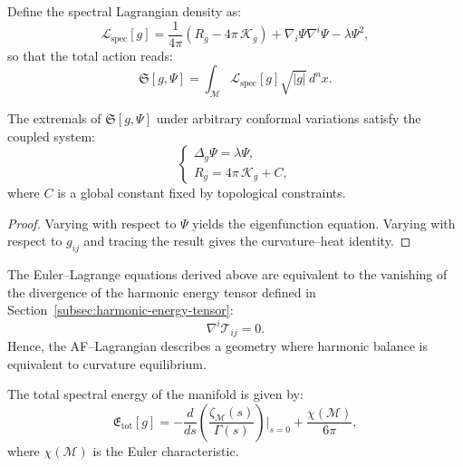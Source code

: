 \begin{definition}
\label{def:spectral-lagrangian}
Define the spectral Lagrangian density as:
\begin{equation}
\label{eq:spectral-lagrangian}
\mathcal{L}_{\mathrm{spec}}[g]
=
\frac{1}{4\pi}
\left(
R_g - 4\pi\,\mathcal{K}_g
\right)
+
\nabla_i \Psi \nabla^i \Psi
- \lambda \Psi^2,
\end{equation}
so that the total action reads:
\[
\mathfrak{S}[g,\Psi]
=
\int_{\mathcal{M}}
\mathcal{L}_{\mathrm{spec}}[g] \sqrt{|g|}\,d^nx.
\]
\end{definition}

\begin{theorem}
\label{thm:AF-variation}
The extremals of \(\mathfrak{S}[g,\Psi]\)
under arbitrary conformal variations
satisfy the coupled system:
\begin{equation}
\begin{cases}
\Delta_g \Psi = \lambda \Psi,\\[3pt]
R_g = 4\pi\,\mathcal{K}_g + C,
\end{cases}
\end{equation}
where \(C\) is a global constant fixed by topological constraints.
\end{theorem}

\begin{proof}
Varying with respect to \(\Psi\) yields the eigenfunction equation.
Varying with respect to \(g_{ij}\)
and tracing the result gives the curvature–heat identity.
\end{proof}

\begin{remark}
The Euler–Lagrange equations derived above
are equivalent to the vanishing of the divergence of
the harmonic energy tensor defined in
Section~\ref{subsec:harmonic-energy-tensor}:
\[
\nabla^i\mathcal{T}_{ij} = 0.
\]
Hence, the AF–Lagrangian describes a geometry
where harmonic balance is equivalent to curvature equilibrium.
\end{remark}


\begin{definition}
\label{def:global-energy}
The total spectral energy of the manifold is given by:
\begin{equation}
\label{eq:global-energy}
\mathfrak{E}_{\mathrm{tot}}[g]
=
-\frac{d}{ds}\left(
\frac{\zeta_{\mathcal{M}}(s)}{\Gamma(s)}
\right)\bigg|_{s=0}
+
\frac{\chi(\mathcal{M})}{6\pi},
\end{equation}
where \(\chi(\mathcal{M})\)
is the Euler characteristic.
\end{definition}

